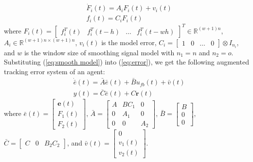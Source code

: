 \documentclass{ieeeaccess}
\newtheorem{remark}{Remark}
\begin{document}
\begin{equation} \label{eq:smooth model}
    \begin{split}
        & \dot{F}_i(t)=A_iF_i(t)+v_i(t) \\
        & f_i(t)=C_iF_i(t)        
    \end{split}
\end{equation}
where $F_i(t)=\begin{bmatrix}
    f_i^T(t) & f_i^T(t-h) & \dots & f_i^T(t-wh)
\end{bmatrix}^T\in\mathbb{R}^{(w+1)n}$, $A_i\in\mathbb{R}^{{(w+1)n}\times{(w+1)n}}$, $v_i(t)$ is the model error, $C_i=\begin{bmatrix}
        1 & 0 & \dots & 0
    \end{bmatrix}\otimes I_{n_i}$, and $w$ is the window size of smoothing signal model with $n_1=n$ and $n_2 = o$. Substituting (\ref{eq:smooth model}) into (\ref{eq:error}), we get the following augmented tracking error system of an agent:
\begin{equation} \label{eq:e_bar}
    \begin{split}
        & \dot{\bar{e}}(t) = \bar{A}\bar{e}(t)+\bar{B}u_{fb}(t)+\bar{v}(t) \\
        & y(t)=\bar{C}\bar{e}(t) + C\pmb{r}(t)
    \end{split}
\end{equation}
where $\bar{e}(t) = \begin{bmatrix}
    \pmb{e}(t) \\ F_1(t) \\ F_2(t)
\end{bmatrix}$, $\bar{A}=\begin{bmatrix}
    A & BC_1 & 0 \\
    0 & A_1 & 0 \\
    0 & 0 & A_2
\end{bmatrix}$, $\bar{B}=\begin{bmatrix}
    B \\ 0 \\ 0
\end{bmatrix}$, $\bar{C}=\begin{bmatrix}
    C & 0 & B_2C_2
\end{bmatrix}$, and $\bar{v}(t)=\begin{bmatrix}
    0 \\ v_1(t) \\ v_2(t)
\end{bmatrix}$.
\end{document}
